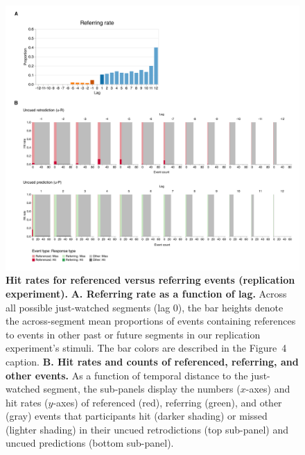 \documentclass[10pt]{article}
\newcommand{\resultTwo}{4}
\begin{document}
\begin{figure}[tp]
    \centering
    \includegraphics[width=\textwidth]{results5_rep}
      \caption{\textbf{Hit rates for referenced versus referring events (replication experiment).} \textbf{A. Referring rate as a function of lag.} Across all possible just-watched segments (lag 0), the bar heights denote the across-segment mean proportions of events containing references to events in other past or future segments in our replication experiment's stimuli. The bar colors are described in the Figure~\resultTwo~ caption. \textbf{B. Hit rates and counts of referenced, referring, and other events.} As a function of temporal distance to the just-watched segment, the sub-panels display the numbers ($x$-axes) and hit rates ($y$-axes) of referenced (red), referring (green), and other (gray) events that participants hit (darker shading) or missed (lighter shading) in their uncued retrodictions (top sub-panel) and uncued predictions (bottom sub-panel).}
    \label{fig:result5_rep}
\end{figure}
\end{document}
